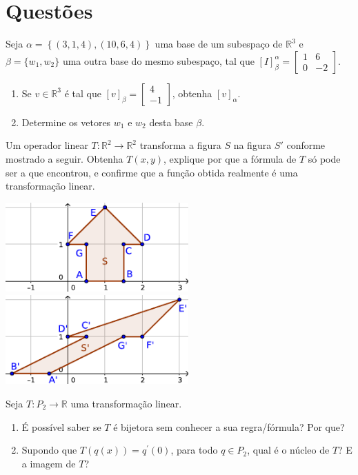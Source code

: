 \documentclass[12pt,a4paper]{article}
\newcommand{\fixme}{{\color{red}(...)}}
\newcommand*\R{\mathbb{R}}
\begin{document}
\section*{Questões}
\begin{ExerciseList}
\Exercise[title={2,5}] Seja $\alpha = \left\{ (3, 1 
, 4), (10, 6, 4) \right\}$ uma base de um subespaço de $\R^3$ e $\beta = \{w_1, w_2\}$ uma outra base do mesmo subespaço, tal que $[I]^\alpha_\beta = \begin{bmatrix}
1 & 6 \\ 0 & -2
\end{bmatrix}$.
\begin{enumerate}
\item Se $v \in \R^3$ é tal que $[v]_\beta = \begin{bmatrix}
4 \\ -1
\end{bmatrix}$, obtenha $[v]_\alpha$.
\item Determine os vetores $w_1$ e $w_2$ desta base $\beta$.
\end{enumerate}
\Answer \fixme

\Exercise[title={2,5}] Um operador linear $T:\R^2 \to \R^2$ transforma a figura $S$ na figura $S'$ conforme mostrado a seguir. Obtenha $T(x,y)$, explique por que a fórmula de $T$ só pode ser a que encontrou, e confirme que a função obtida realmente é uma transformação linear.
\begin{center}
\includegraphics[width=7.0cm]{img/prova-3-pro-plano-1}
\hspace{1cm}
\includegraphics[width=7.0cm]{img/prova-3-pro-plano-2}
\end{center}
\Answer \fixme

\Exercise[title={2,5}] Seja $T: P_2 \to \R$ uma transformação linear.
\begin{enumerate}
\item É possível saber se $T$ é bijetora sem conhecer a sua regra/fórmula? Por que?
\item Supondo que $T( q(x) ) = q^{\prime}(0)$, para todo $q \in P_2$, qual é o núcleo de $T$? E a imagem de $T$?
\end{enumerate}
\Answer \fixme


\end{ExerciseList}
\end{document}
